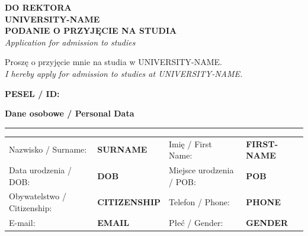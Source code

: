 \documentclass[10pt, a4paper]{article} %
\begin{document}
\vspace{0.4cm}

\begin{center}
    \large \textbf{DO REKTORA} \\
    \large \textbf{{{UNIVERSITY-NAME}}} \\
    \vspace{0.3cm}
    \Large \textbf{PODANIE O PRZYJĘCIE NA STUDIA} \\
    \small \textit{Application for admission to studies}
\end{center}

\vspace{0.3cm}
\noindent \small Proszę o przyjęcie mnie na studia w {{UNIVERSITY-NAME}}. \\
\scriptsize \textit{I hereby apply for admission to studies at {{UNIVERSITY-NAME}}.}

\vspace{0.4cm}

\noindent
\large \textbf{PESEL / ID:} 

\vspace{0.3cm}

\begin{center}
    \large \textbf {Dane osobowe / Personal Data} \\
\end{center}
\vspace{-0.3cm}
\noindent\rule{\textwidth}{0.8pt}
\vspace{0.1cm}

\noindent
\renewcommand{\arraystretch}{1.2}
\begin{tabularx}{\textwidth}{@{}l X l X@{}}
\small Nazwisko / Surname: & \small \textbf{{{SURNAME}}} & \small Imię / First Name: & \small \textbf{{{FIRST-NAME}}} \\
\small Data urodzenia / DOB: & \small \textbf{{{DOB}}} & \small Miejsce urodzenia / POB: & \small \textbf{{{POB}}} \\
\small Obywatelstwo / Citizenship: & \small \textbf{{{CITIZENSHIP}}} & \small Telefon / Phone: & \small \textbf{{{PHONE}}} \\
\small E-mail: & \small \textbf{{{EMAIL}}} & \small Płeć / Gender: & \small \textbf{{{GENDER}}} \\
\end{tabularx}

\vspace{0.3cm}
\end{document}
